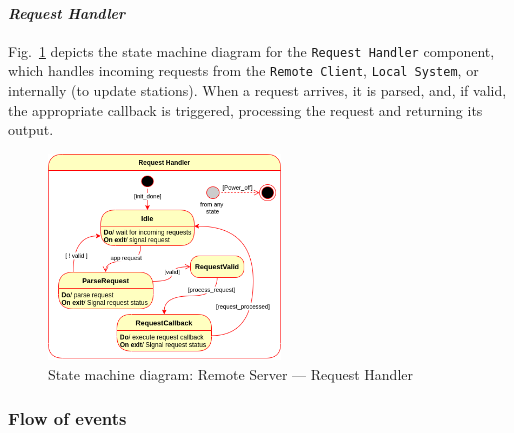 \paragraph{\emph{Request Handler}}
Fig.~\ref{fig:state-mach-rs-req} depicts the state machine diagram for the
\texttt{Request Handler} component, which handles incoming requests from the
  \texttt{Remote Client}, \texttt{Local System}, or internally (to update stations). When a request arrives, it is parsed, and, if valid,
  the appropriate callback is triggered, processing the request and returning
  its output.
%  
\begin{figure}[htb!]
  \centering
  \includegraphics[width=0.55\textwidth]{img/state-mach-rs-req.png}%
  \caption{State machine diagram: Remote Server --- Request Handler}%
  \label{fig:state-mach-rs-req}
\end{figure}
%
%

\subsubsection{Flow of events}
\label{sec:flow-events-2}

